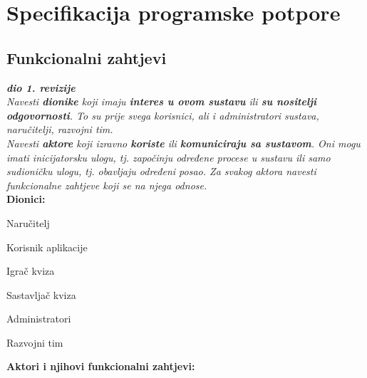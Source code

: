 \chapter{Specifikacija programske potpore}
		
	\section{Funkcionalni zahtjevi}
			
			\textbf{\textit{dio 1. revizije}}\\
			
			\textit{Navesti \textbf{dionike} koji imaju \textbf{interes u ovom sustavu} ili  \textbf{su nositelji odgovornosti}. To su prije svega korisnici, ali i administratori sustava, naručitelji, razvojni tim.}\\
				
			\textit{Navesti \textbf{aktore} koji izravno \textbf{koriste} ili \textbf{komuniciraju sa sustavom}. Oni mogu imati inicijatorsku ulogu, tj. započinju određene procese u sustavu ili samo sudioničku ulogu, tj. obavljaju određeni posao. Za svakog aktora navesti funkcionalne zahtjeve koji se na njega odnose.}\\
			
			
			\noindent \textbf{Dionici:}
			
			\begin{packed_enum}
				
				\item Naručitelj
				\item Korisnik aplikacije
				\begin{packed_enum}
					\item Igrač kviza
					\item Sastavljač kviza
				\end{packed_enum}				
				\item Administratori
				\item Razvojni tim
				
			\end{packed_enum}
			
			\noindent \textbf{Aktori i njihovi funkcionalni zahtjevi:}
			
